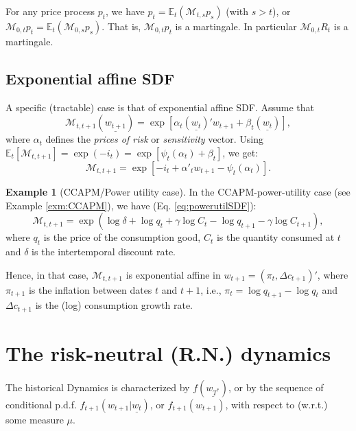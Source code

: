 \documentclass[
  12pt,
]{book}
\theoremstyle{definition}
\theoremstyle{definition}
\newtheorem{example}{Example}[chapter]
\theoremstyle{definition}
\theoremstyle{definition}
\theoremstyle{remark}
\begin{document}
For any price process \(p_t\), we have \(p_t = \mathbb{E}_t(\mathcal{M}_{t,s} p_s)\) (with \(s>t\)), or \(\mathcal{M}_{0,t} p_t = \mathbb{E}_t(\mathcal{M}_{0,s}p_s)\). That is, \(\mathcal{M}_{0,t} p_t\) is a martingale. In particular \(\mathcal{M}_{0,t} R_t\) is a martingale.

\hypertarget{PricingAffine}{%
\subsection{Exponential affine SDF}\label{PricingAffine}}

A specific (tractable) case is that of exponential affine SDF. Assume that
\[
\mathcal{M}_{t,t+1}(\underline{w_{t+1}}) = \exp[\alpha_t(\underline{w_t})'w_{t+1}+\beta_t(\underline{w_t})],
\]
where \(\alpha_t\) defines the \emph{prices of risk} or \emph{sensitivity} vector. Using \(\mathbb{E}_t[\mathcal{M}_{t,t+1}]=\exp(-i_{t})=\exp[\psi_t(\alpha_t)+\beta_t]\), we get:
\begin{equation}
\boxed{\mathcal{M}_{t,t+1} = \exp[-i_{t}+\alpha'_tw_{t+1}-\psi_t(\alpha_t)].}\label{eq:keySDF}
\end{equation}

\begin{example}[CCAPM/Power utility case]
In the CCAPM-power-utility case (see Example \ref{exm:CCAPM}), we have (Eq. \eqref{eq:powerutilSDF}):
\[
\mathcal{M}_{t,t+1} = \exp(\log \delta + \log q_t + \gamma \log   C_t - \log   q_{t+1} - \gamma  \log   C_{t+1}),
\]
where \(q_t\) is the price of the consumption good, \(C_t\) is the quantity consumed at \(t\) and \(\delta\) is the intertemporal discount rate.

Hence, in that case, \(\mathcal{M}_{t,t+1}\) is exponential affine in \(w_{t+1} = (\pi_t, \Delta c_{t+1})'\), where \(\pi_{t+1}\) is the inflation between dates \(t\) and \(t+1\), i.e., \(\pi_t = \log q_{t+1} - \log q_{t}\) and \(\Delta c_{t+1}\) is the (log) consumption growth rate.
\end{example}

\hypertarget{PricingRN}{%
\section{The risk-neutral (R.N.) dynamics}\label{PricingRN}}

The historical Dynamics is characterized by \(f(\underline{w_{T^*}})\), or by the
sequence of conditional p.d.f. \(f_{t+1}(w_{t+1}|\underline{w_t})\), or
\(f_{t+1}(w_{t+1})\), with respect to (w.r.t.) some measure \(\mu\).
\end{document}
